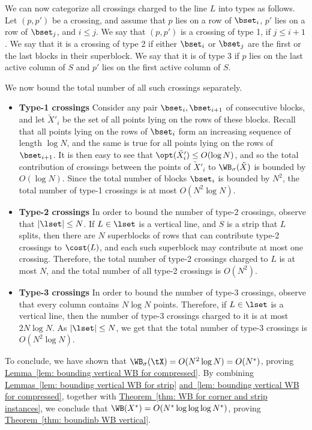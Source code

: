 \documentclass[11pt]{article}
\numberwithin{equation}{section}
\theoremstyle{definition}
\theoremstyle{plain}
\newcommand{\expref}[2]{\hyperref[#2]{#1~\ref{#2}}}
\begin{document}
We can now categorize all crossings charged to the line $L$ into types as follows. Let $(p,p')$ be a crossing, and assume that $p$ lies on a row of $\bset_i$, $p'$ lies on a row of $\bset_j$, and $i\leq j$. We say that $(p,p')$ is a crossing of type 1, if $j\leq i+1$. We say that 
it is a crossing of type 2 if either $\bset_i$ or $\bset_j$ are the first or the last blocks in their superblock. We say that it is of type 3 if $p$ lies on the last active column of $S$ and $p'$ lies on the first active column of $S$.

We now bound the total number of all such crossings separately.

\begin{itemize}
    \item {\bf Type-1 crossings}
Consider any pair $\bset_i,\bset_{i+1}$ of consecutive blocks, and let $\tilde X'_i$ be the set of all points lying on the rows of these blocks. Recall that all points lying on the rows of $\bset_i$ form an increasing sequence of length $\log N$, and the same is true for all points lying on the rows of $\bset_{i+1}$. It is then easy to see that $\opt(\tilde X'_i)\leq O(\log N)$, and so the total contribution of crossings between the points of $\tilde X'_i$ to $\WB_{\sigma}(\tilde X)$ is bounded by $O(\log N)$. Since the total number of blocks $\bset_i$ is bounded by $N^2$, the total number of type-1 crossings is at most $O(N^2\log N)$.

\item {\bf Type-2 crossings}
In order to bound the number of type-2 crossings, observe that $|\lset|\leq N$. If $L\in \lset$ is a vertical line, and $S$ is a strip that $L$ splits, then there are $N$ superblocks of rows that can contribute type-2 crossings to $\cost(L)$, and each such superblock may contribute at most one crossing. Therefore, the total number of type-2 crossings charged to $L$ is at most $N$, and the total number of all type-2 crossings is $O(N^2)$.

\item {\bf Type-3 crossings}
In order to bound the number of type-3 crossings, observe that every column contains $N\log N$ points. Therefore, if $L\in \lset$ is a vertical line, then the number of type-3 crossings charged to it is at most $2N\log N$. As $|\lset|\leq N$, we get that the total number of type-3 crossings is $O(N^2\log N)$.

\end{itemize}



To conclude, we have shown that $\WB_{\sigma}(\tX)=O(N^2\log N)=O(N^*)$, proving \expref{Lemma}{lem: bounding vertical WB for compressed}. By combining \expref{Lemmas}{lem: bounding vertical WB for strip} \expref{and}{lem: bounding vertical WB for compressed}, together with \expref{Theorem}{thm: WB for corner and strip instances}, we conclude that $\WB(X^*)=O(N^*\log\log\log N^*)$, proving \expref{Theorem}{thm: boundinb WB vertical}.
\end{document}
